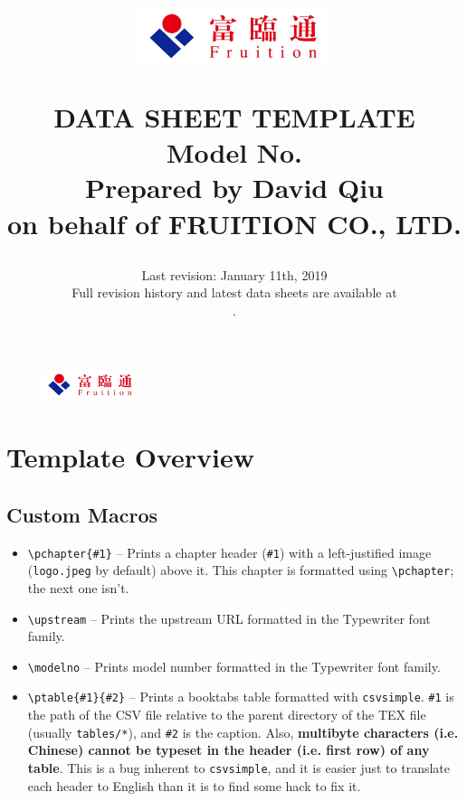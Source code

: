 \documentclass{scrreprt}
\title{
	\begin{figure}[H]
		\centering\includegraphics[width=0.5\textwidth]{logo.jpeg}
	\end{figure}
	\vspace{1cm}
	\flushright
	\Huge{DATA SHEET TEMPLATE}\\
	\vspace{2cm}
	\huge{Model No. \modelno}\\
	\vspace{2cm}
	\LARGE{Prepared by David Qiu \\ on behalf of FRUITION CO., LTD.}
}
\date{
	Last revision: January 11th, 2019\\
	\vspace{0.5cm}
	Full revision history and latest data sheets are available at\\
	\vspace{0.25cm}
	\upstream.
}
\newcommand{\pchapter}[1]{
	\begingroup\let\clearpage\relax
	\newpage
	\begin{figure}[H]
		\includegraphics[width=0.25\textwidth]{logo.jpeg}
	\end{figure}
	\chapter{#1}
	\endgroup
}
\newcommand{\modelno}{
	\texttt{<++>}
}
\newcommand{\upstream}{
	\small\texttt{https://github.com/diracs-delta/fruition-specs/%
		      tree/master/<++>}
}
\newcommand{\ptable}[2]{
	\begin{table}[H]
	\caption{#2}
	\centering\csvautobooktabular{#1}
	\end{table}
}
\begin{document}
\begin{CJK*}{UTF8}{gbsn}
\maketitle
\tableofcontents

\pchapter{Template Overview}
\section{Custom Macros}
\begin{itemize}
\item \verb|\pchapter{#1}| -- Prints a chapter header (\verb|#1|) with a
left-justified image (\verb|logo.jpeg| by default) above it. This chapter is
formatted using \verb|\pchapter|; the next one isn't.

\item \verb|\upstream| -- Prints the upstream URL formatted in the Typewriter
font family.

\item \verb|\modelno| -- Prints model number formatted in the Typewriter font
family.

\item \verb|\ptable{#1}{#2}| -- Prints a booktabs table formatted with
\verb|csvsimple|. \verb|#1| is the path of the CSV file relative to the parent
directory of the TEX file (usually \verb|tables/*|), and \verb|#2| is the
caption. Also, \textbf{multibyte characters (i.e. Chinese) cannot be typeset in
the header (i.e. first row) of any table}. This is a bug inherent to
\verb|csvsimple|, and it is easier just to translate each header to English than
it is to find some hack to fix it.
\end{itemize}

\Blinddocument

\end{CJK*}
\end{document}
